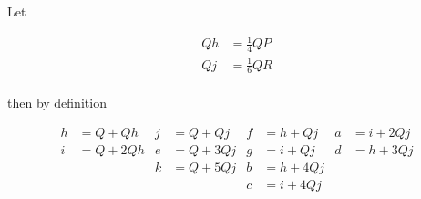 \documentclass{article}
\newcommand{\QR}{QR}
\newcommand{\QP}{QP}
\begin{document}
Let

\newcommand{\Qh}{Qh}
\newcommand{\Qj}{Qj}

\begin{align*}
  \Qh &= \frac{1}{4}\QP \\
  \Qj &= \frac{1}{6}\QR \\
\end{align*}

then by definition

\begin{align*}
  h &= Q + \Qh  & j &= Q + \Qj  & f &= h + \Qj  & a &= i + 2\Qj \\
  i &= Q + 2\Qh & e &= Q + 3\Qj & g &= i + \Qj  & d &= h + 3\Qj \\
    &           & k &= Q + 5\Qj & b &= h + 4\Qj &   &           \\
    &           &   &           & c &= i + 4\Qj &   &           \\
\end{align*}
\end{document}
